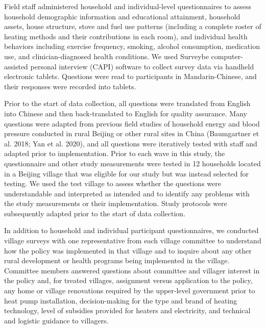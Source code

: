 \documentclass[
  letterpaper,
  DIV=11,
  numbers=noendperiod]{scrartcl}
\providecommand{\DIFadd}[1]{{\protect\color{blue}\uwave{#1}}} %
\providecommand{\DIFaddbegin}{} %
\providecommand{\DIFaddend}{} %
\providecommand{\DIFdelbegin}{} %
\providecommand{\DIFdelend}{} %
\newcommand{\DIFscaledelfig}{0.5}
\newlength{\DIFdelgraphicswidth} %
\newlength{\DIFdelgraphicsheight} %
\newcommand{\DIFaddincludegraphics}[2][]{{\color{blue}\fbox{\DIFOincludegraphics[#1]{#2}}}} %
\newcommand{\DIFdelincludegraphics}[2][]{%
\sbox{\DIFdelgraphicsbox}{\DIFOincludegraphics[#1]{#2}}%
\settoboxwidth{\DIFdelgraphicswidth}{\DIFdelgraphicsbox} %
\settoboxtotalheight{\DIFdelgraphicsheight}{\DIFdelgraphicsbox} %
\scalebox{\DIFscaledelfig}{%
\parbox[b]{\DIFdelgraphicswidth}{\usebox{\DIFdelgraphicsbox}\\[-\baselineskip] \rule{\DIFdelgraphicswidth}{0em}}\llap{\resizebox{\DIFdelgraphicswidth}{\DIFdelgraphicsheight}{%
\setlength{\unitlength}{\DIFdelgraphicswidth}%
\begin{picture}(1,1)%
\thicklines\linethickness{2pt} %
{\color[rgb]{1,0,0}\put(0,0){\framebox(1,1){}}}%
{\color[rgb]{1,0,0}\put(0,0){\line( 1,1){1}}}%
{\color[rgb]{1,0,0}\put(0,1){\line(1,-1){1}}}%
\end{picture}%
}\hspace*{3pt}}} %
} %
\DeclareRobustCommand{\DIFaddbegin}{\DIFOaddbegin \let\includegraphics\DIFaddincludegraphics} %
\DeclareRobustCommand{\DIFaddend}{\DIFOaddend \let\includegraphics\DIFOincludegraphics} %
\DeclareRobustCommand{\DIFdelbegin}{\DIFOdelbegin \let\includegraphics\DIFdelincludegraphics} %
\DeclareRobustCommand{\DIFdelend}{\DIFOaddend \let\includegraphics\DIFOincludegraphics} %
\begin{document}
Field staff administered household and individual-level questionnaires
to assess household demographic information and educational attainment,
household assets, house structure, stove and fuel use patterns
(including a complete roster of heating methods and their contributions
in each room), and individual health behaviors including exercise
frequency, smoking, alcohol consumption, medication use, and
clinician-diagnosed health conditions. We used Surveybe
computer-assisted personal interview (CAPI) software to collect survey
data via handheld electronic tablets. Questions were read to
participants in Mandarin-Chinese, and their responses were recorded into
tablets.

Prior to the start of data collection, all questions were translated
from English into Chinese and then back-translated to English for
quality assurance. Many questions were adapted from previous field
studies of household energy and blood pressure conducted in rural
Beijing or other rural sites in China (Baumgartner et al. 2018; Yan et
al. 2020), and all questions were iteratively tested with staff and
adapted prior to implementation. Prior to each wave in this study, the
questionnaire and other study measurements were tested in 12 households
located in a Beijing village that was eligible for our study but was
instead selected for testing. We used the test village to assess whether
the questions were understandable and interpreted as intended and to
identify any problems with the study measurements or their
implementation. Study protocols were subsequently adapted prior to the
start of data collection.

In addition to household and individual participant questionnaires, we
conducted village surveys with one representative from each village
committee to understand how the policy was implemented in that village
and to inquire about any other rural development or health programs
being implemented in the village. Committee members answered questions
about committee and villager interest in the policy and, for treated
villages, assignment versus application to the policy, any home or
village renovations required by the upper-level government prior to heat
pump installation, decision-making for the type and brand of heating
technology, level of subsidies provided for heaters and electricity, and
technical and logistic guidance to villagers.

\DIFdelbegin %
\DIFdelend \DIFaddbegin \subsubsection{\DIFadd{Blood pressure}}\label{blood-pressure}
\DIFaddend 
\end{document}
